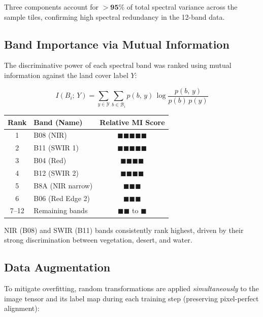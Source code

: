 \documentclass[12pt, a4paper]{article}
\begin{document}
Three components account for $\mathbf{>95\%}$ of total spectral variance across the sample tiles, confirming high spectral redundancy in the 12-band data.

\subsection{Band Importance via Mutual Information}

The discriminative power of each spectral band was ranked using mutual information against the land cover label $Y$:

\begin{equation}
  I(B_i;\, Y) = \sum_{y \in \mathcal{Y}} \sum_{b \in \mathcal{B}_i}
    p(b,\,y)\, \log \frac{p(b,\,y)}{p(b)\,p(y)}
  \label{eq:mi}
\end{equation}

\begin{center}
\renewcommand{\arraystretch}{1.2}
\begin{tabular}{clc}
\toprule
\textbf{Rank} & \textbf{Band (Name)} & \textbf{Relative MI Score} \\
\midrule
1 & B08 (NIR)            & $\blacksquare\blacksquare\blacksquare\blacksquare\blacksquare$ \\
2 & B11 (SWIR 1)         & $\blacksquare\blacksquare\blacksquare\blacksquare\blacksquare$ \\
3 & B04 (Red)            & $\blacksquare\blacksquare\blacksquare\blacksquare$ \\
4 & B12 (SWIR 2)         & $\blacksquare\blacksquare\blacksquare\blacksquare$ \\
5 & B8A (NIR narrow)     & $\blacksquare\blacksquare\blacksquare$ \\
6 & B06 (Red Edge 2)     & $\blacksquare\blacksquare\blacksquare$ \\
7–12 & Remaining bands    & $\blacksquare\blacksquare$ to $\blacksquare$ \\
\bottomrule
\end{tabular}
\end{center}

NIR (B08) and SWIR (B11) bands consistently rank highest, driven by their strong discrimination between vegetation, desert, and water.

\subsection{Data Augmentation}

To mitigate overfitting, random transformations are applied \textit{simultaneously} to the image tensor and its label map during each training step (preserving pixel-perfect alignment):
\end{document}

